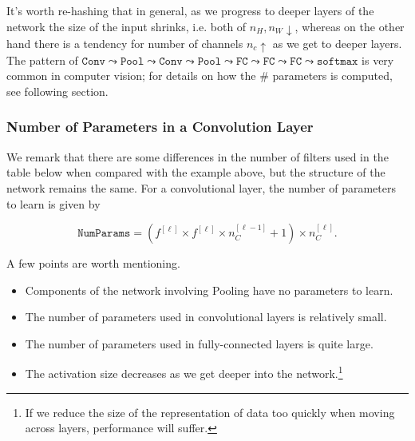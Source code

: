 \documentclass[12pt]{article}
\begin{document}
It's worth re-hashing that in general, as we progress to deeper layers of the network the size of the input shrinks, i.e.
both of $n_H, n_W \downarrow$, whereas on the other hand there is a tendency for number of channels $n_c \uparrow$ as we get
to deeper layers. The pattern of $\texttt{Conv} \leadsto \texttt{Pool} \leadsto \texttt{Conv} \leadsto \texttt{Pool} \leadsto \texttt{FC} \leadsto \texttt{FC} \leadsto \texttt{FC} \leadsto \texttt{softmax}$ is very common in computer vision; for details on how the \# parameters is computed, see following section.

\begin{table}[h]
  \centering
   \end{table}

\subsubsection{Number of Parameters in a Convolution Layer}
We remark that there are some differences in the number of filters used in the table below when compared with the example above,
but the structure of the network remains the same. For a convolutional layer, the number of parameters to learn is given by

\[
\texttt{NumParams} = \left(f^{[\ell]} \times f^{[\ell]} \times n_C^{[\ell-1]} + 1 \right) \times n_C^{[\ell]}.
\]

A few points are worth mentioning.
\begin{itemize} \itemsep0em 
  \item Components of the network involving Pooling have no parameters to learn.
  \item The number of parameters used in convolutional layers is relatively small.
  \item The number of parameters used in fully-connected layers is quite large.
  \item The activation size decreases as we get deeper into the network.\footnote{If we reduce the size of the representation of data too quickly when moving across layers, performance will suffer.} \end{itemize}
\end{document}
